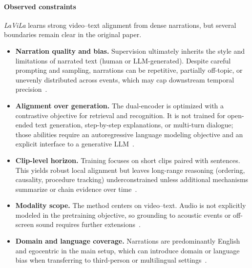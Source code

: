 \begin{enrichment}
\begin{enrichment}
        \paragraph{Observed constraints}
        \emph{LaViLa} learns strong video–text alignment from dense narrations, but several boundaries remain clear in the original paper.~\cite{zhao2022_lavila} 
        \begin{itemize}
            \item \textbf{Narration quality and bias.} Supervision ultimately inherits the style and limitations of narrated text (human or LLM-generated). Despite careful prompting and sampling, narrations can be repetitive, partially off-topic, or unevenly distributed across events, which may cap downstream temporal precision~\cite{zhao2022_lavila}.
            \item \textbf{Alignment over generation.} The dual-encoder is optimized with a contrastive objective for retrieval and recognition. It is not trained for open-ended text generation, step-by-step explanations, or multi-turn dialogue; those abilities require an autoregressive language modeling objective and an explicit interface to a generative LLM~\cite{zhao2022_lavila}.
            \item \textbf{Clip-level horizon.} Training focuses on short clips paired with sentences. This yields robust local alignment but leaves long-range reasoning (ordering, causality, procedure tracking) underconstrained unless additional mechanisms summarize or chain evidence over time~\cite{zhao2022_lavila}.
            \item \textbf{Modality scope.} The method centers on video–text. Audio is not explicitly modeled in the pretraining objective, so grounding to acoustic events or off-screen sound requires further extensions~\cite{zhao2022_lavila}.
            \item \textbf{Domain and language coverage.} Narrations are predominantly English and egocentric in the main setup, which can introduce domain or language bias when transferring to third-person or multilingual settings~\cite{zhao2022_lavila}.
        \end{itemize}
        

\end{enrichment}
\end{enrichment}
